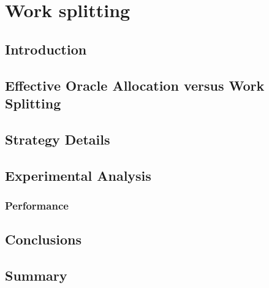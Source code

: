 \chapter{Work splitting}
\label{work_split}

\section{Introduction}

\section{Effective Oracle Allocation versus Work Splitting}

\section{Strategy Details}

\section{Experimental Analysis}

\subsection{Performance}

\section{Conclusions}

\section{Summary}


